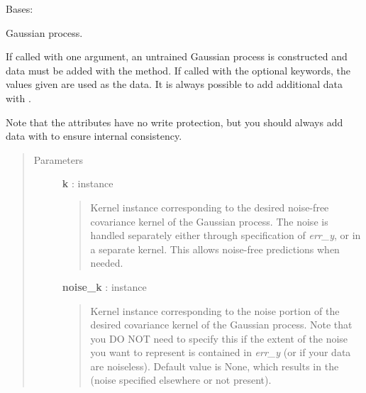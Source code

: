 \documentclass[letterpaper,10pt,english]{sphinxmanual}
\begin{document}
\begin{fulllineitems}
\label{gptools:gptools.gaussian_process.GaussianProcess}
Bases: 

Gaussian process.

If called with one argument, an untrained Gaussian process is constructed
and data must be added with the {\hyperref[gptools:gptools.gaussian_process.GaussianProcess.add_data]{}} method. If called with
the optional keywords, the values given are used as the data. It is always
possible to add additional data with {\hyperref[gptools:gptools.gaussian_process.GaussianProcess.add_data]{}}.

Note that the attributes have no write protection, but you should always
add data with {\hyperref[gptools:gptools.gaussian_process.GaussianProcess.add_data]{}} to ensure internal consistency.
\begin{quote}\begin{description}
\item[{Parameters}] \leavevmode
\textbf{k} : {\hyperref[gptools.kernel:gptools.kernel.core.Kernel]{}} instance
\begin{quote}

Kernel instance corresponding to the desired noise-free covariance
kernel of the Gaussian process. The noise is handled separately either
through specification of \emph{err\_y}, or in a separate kernel. This allows
noise-free predictions when needed.
\end{quote}

\textbf{noise\_k} : {\hyperref[gptools.kernel:gptools.kernel.core.Kernel]{}} instance
\begin{quote}

Kernel instance corresponding to the noise portion of the desired
covariance kernel of the Gaussian process. Note that you DO NOT need to
specify this if the extent of the noise you want to represent is
contained in \emph{err\_y} (or if your data are noiseless). Default value is
None, which results in the {\hyperref[gptools.kernel:gptools.kernel.noise.ZeroKernel]{}}
(noise specified elsewhere or not present).
\end{quote}


\end{description}
\end{quote}
\end{fulllineitems}
\end{document}
